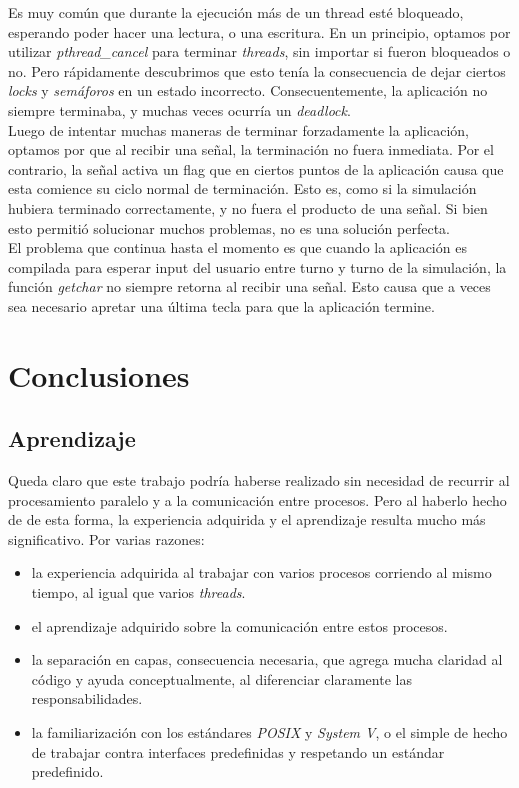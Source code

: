 \documentclass[a4paper,10pt]{article}
\begin{document}
Es muy común que durante la ejecución más de un thread esté bloqueado, esperando poder hacer una lectura, o una escritura.
En un principio, optamos por utilizar \textit{pthread\_cancel} para terminar \textit{threads}, sin importar si fueron bloqueados o no.
Pero rápidamente descubrimos que esto tenía la consecuencia de dejar ciertos \textit{locks} y \textit{semáforos} en un estado incorrecto.
Consecuentemente, la aplicación no siempre terminaba, y muchas veces ocurría un \textit{deadlock}.\\

Luego de intentar muchas maneras de terminar forzadamente la aplicación, optamos por que al recibir una señal, la terminación no fuera inmediata.
Por el contrario, la señal activa un flag que en ciertos puntos de la aplicación causa que esta comience su ciclo normal de terminación.
Esto es, como si la simulación hubiera terminado correctamente, y no fuera el producto de una señal.
Si bien esto permitió solucionar muchos problemas, no es una solución perfecta.\\

El problema que continua hasta el momento es que cuando la aplicación es compilada para esperar input del usuario entre turno y turno de la simulación, 
la función \textit{getchar} no siempre retorna al recibir una señal. Esto causa que a veces sea necesario apretar una última tecla para que la aplicación termine.


\newpage
\section{Conclusiones}

\subsection{Aprendizaje}
Queda claro que este trabajo podría haberse realizado sin necesidad de recurrir al procesamiento paralelo y a la comunicación entre procesos. Pero al haberlo 
hecho de de esta forma, la experiencia adquirida y el aprendizaje resulta mucho más significativo. Por varias razones:

\begin{itemize}
\item la experiencia adquirida al trabajar con varios procesos corriendo al mismo tiempo, al igual que varios \textit{threads}.
\item el aprendizaje adquirido sobre la comunicación entre estos procesos.
\item la separación en capas, consecuencia necesaria, que agrega mucha claridad al código y ayuda conceptualmente, al diferenciar claramente las responsabilidades.
\item la familiarización con los estándares \textit{POSIX} y \textit{System V}, o el simple de hecho de trabajar contra interfaces predefinidas y respetando
      un estándar predefinido.
\end{itemize}
\end{document}
